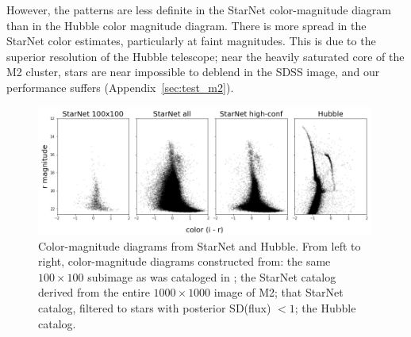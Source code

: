 However, 
the patterns are less definite in the StarNet color-magnitude diagram than in the Hubble color magnitude diagram.
There is more spread in the StarNet color estimates, particularly at faint magnitudes. 
This is due to the superior resolution of the Hubble telescope; near the heavily saturated core of the M2 cluster, stars are near impossible to deblend in the SDSS image, and our performance suffers (Appendix~\ref{sec:test_m2}). 




\begin{figure}[tb]
    \centering
    \includegraphics[width=0.99\textwidth]{figures/m2_results/m2_cmd.png}
    \caption{Color-magnitude diagrams from StarNet and Hubble. From left to right, color-magnitude diagrams constructed from: the same $100\times100$ subimage as was cataloged in \cite{Feder_2019}; 
    the StarNet catalog derived from the entire $1000 \times 1000$ image of M2; 
    that StarNet catalog, filtered to stars with posterior SD(flux) $< 1$; the Hubble catalog. 
}
    \label{fig:m2_cmd}
\end{figure}



